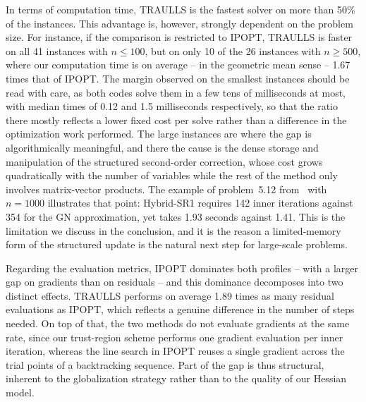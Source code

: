 \documentclass[pdflatex,sn-mathphys-num]{sn-jnl}%
\theoremstyle{thmstyleone}%
\begin{document}
In terms of computation time, TRAULLS is the fastest solver on more than 50\% of the instances. This advantage is, however, strongly dependent on the problem size. For instance, if the comparison is restricted to IPOPT, TRAULLS is faster on all 41 instances with $n \le 100$, but on only 10 of the 26 instances with $n \ge 500$, where our computation time is on average -- in the geometric mean sense -- 1.67 times that of IPOPT. The margin observed on the smallest instances should be read with care, as both codes solve them in a few tens of milliseconds at most, with median times of 0.12 and 1.5 milliseconds respectively, so that the ratio there mostly reflects a lower fixed cost per solve rather than a difference in the optimization work performed. The large instances are where the gap is algorithmically meaningful, and there the cause is the dense storage and manipulation of the structured second-order correction, whose cost grows quadratically with the number of variables while the rest of the method only involves matrix-vector products. The example of problem~5.12 from~\cite{lucksanvlcek:1999} with $n=1000$ illustrates that point: Hybrid-SR1 requires 142 inner iterations against 354 for the GN approximation, yet takes 1.93 seconds against 1.41. This is the limitation we discuss in the conclusion, and it is the reason a limited-memory form of the structured update is the natural next step for large-scale problems.

Regarding the evaluation metrics, IPOPT dominates both profiles -- with a larger gap on gradients than on residuals -- and this dominance decomposes into two distinct effects. TRAULLS performs on average 1.89 times as many residual evaluations as IPOPT, which reflects a genuine difference in the number of steps needed. On top of that, the two methods do not evaluate gradients at the same rate, since our trust-region scheme performs one gradient evaluation per inner iteration, whereas the line search in IPOPT reuses a single gradient across the trial points of a backtracking sequence. Part of the gap is thus structural, inherent to the globalization strategy rather than to the quality of our Hessian model.
\end{document}
